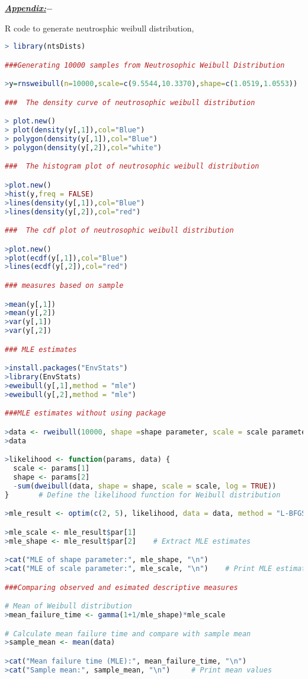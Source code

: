\documentclass[12pt,a4paper,oneside]{article}
\begin{document}
\newpage
\begin{Large}
\textrm{\textit{\textbf{\underline{Appendix:$-$}}}}
\end{Large}
\newline\newline
R code to generate neutrosphic weibull distribution,\newline\newline
\begin{lstlisting}[language=R]
> library(ntsDists)

###Generating 10000 samples from Neutrosophic Weibull Distribution

>y=rnsweibull(n=10000,scale=c(9.5544,10.3370),shape=c(1.0519,1.0553))

###  The density curve of neutrosophic weibull distribution

> plot.new()
> plot(density(y[,1]),col="Blue")
> polygon(density(y[,1]),col="Blue")
> polygon(density(y[,2]),col="white") 

###  The histogram plot of neutrosophic weibull distribution

>plot.new()
>hist(y,freq = FALSE)
>lines(density(y[,1]),col="Blue")
>lines(density(y[,2]),col="red")

###  The cdf plot of neutrosophic weibull distribution

>plot.new()
>plot(ecdf(y[,1]),col="Blue")
>lines(ecdf(y[,2]),col="red")

### measures based on sample

>mean(y[,1])
>mean(y[,2])
>var(y[,1])
>var(y[,2])

### MLE estimates

>install.packages("EnvStats")
>library(EnvStats)
>eweibull(y[,1],method = "mle")
>eweibull(y[,2],method = "mle")

###MLE estimates without using package

>data <- rweibull(10000, shape =shape parameter, scale = scale parameter)
>data

>likelihood <- function(params, data) {
  scale <- params[1]
  shape <- params[2]
  -sum(dweibull(data, shape = shape, scale = scale, log = TRUE))
}       # Define the likelihood function for Weibull distribution

>mle_result <- optim(c(2, 5), likelihood, data = data, method = "L-BFGS-B")          # Use optim function to obtain MLE of parameters

>mle_scale <- mle_result$par[1]
>mle_shape <- mle_result$par[2]    # Extract MLE estimates

>cat("MLE of shape parameter:", mle_shape, "\n")
>cat("MLE of scale parameter:", mle_scale, "\n")    # Print MLE estimates

###Comparing observed and esimated descriptive measures

# Mean of Weibull distribution
>mean_failure_time <- gamma(1+1/mle_shape)*mle_scale 

# Calculate mean failure time and compare with sample mean
>sample_mean <- mean(data)    

>cat("Mean failure time (MLE):", mean_failure_time, "\n")
>cat("Sample mean:", sample_mean, "\n")     # Print mean values
\end{lstlisting}
\end{document}
